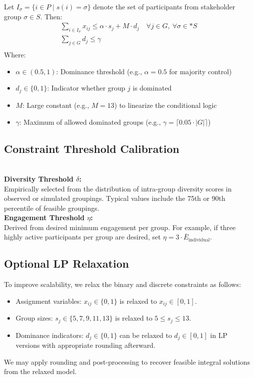 Let \(I_\sigma = \{i \in P \mid s(i) = \sigma\}\) denote the set of participants from stakeholder group \(\sigma \in S\).
Then:
\begin{gather*}
    \sum_{i \in I_\sigma} x_{ij} \leq \alpha \cdot s_j + M \cdot d_j \quad \forall j \in G,\ \forall \sigma \in* S\\
    \sum_{j \in G} d_j \leq \gamma\\
\end{gather*}
\vspace{-0.5cm}
Where:
\begin{itemize}
    \item \(\alpha \in (0.5, 1)\): Dominance threshold (e.g., \(\alpha = 0.5\) for majority control)
    \item \(d_j \in \{0,1\}\): Indicator whether group \(j\) is dominated
    \item \(M\): Large constant (e.g., \(M = 13\)) to linearize the conditional logic
    \item \(\gamma\): Maximum of allowed dominated groups (e.g., \(\gamma = \lceil 0.05 \cdot |G| \rceil\))
\end{itemize}

\subsection*{Constraint Threshold Calibration}
\\
\textbf{Diversity Threshold \(\delta\):}\\
Empirically selected from the distribution of intra-group diversity scores in observed or simulated groupings.
Typical values include the 75th or 90th percentile of feasible groupings.
\\
\textbf{Engagement Threshold \(\eta\):}\\
Derived from desired minimum engagement per group.
For example, if three highly active participants per group are desired,
set \(\eta = 3 \cdot \bar{E}_{\text{individual}}\).

\subsection*{Optional LP Relaxation}

To improve scalability, we relax the binary and discrete constraints as follows:
\begin{itemize}
    \item Assignment variables: \quad $x_{ij} \in \{0,1\}$ is relaxed to $x_{ij} \in [0,1]$.
    \item Group sizes: \quad $s_j \in \{5,7,9,11,13\}$ is relaxed to $5 \leq s_j \leq 13$.
    \item Dominance indicators: \quad $d_j \in \{0,1\}$ can be relaxed to $d_j \in [0,1]$ in LP versions with appropriate rounding afterward.
\end{itemize}
We may apply rounding and post-processing to recover feasible integral solutions from the relaxed model.
